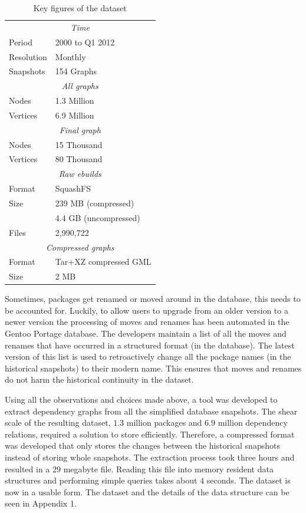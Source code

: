 \documentclass[smallextended,final]{svjour3}
\begin{document}
\begin{table}
\vspace{-1em}
\small\centering
\caption{Key figures of the dataset}\label{tbl:dataset}
\begin{tabular}{ll}
\toprule
\multicolumn{2}{c}{\emph{Time}} \\[0.5mm]
Period & 2000 to Q1 2012 \\
Resolution & Monthly \\
Snapshots & 154 Graphs \\
\midrule
\multicolumn{2}{c}{\emph{All graphs}} \\[0.5mm]
Nodes & 1.3 Million \\
Vertices & 6.9 Million \\
\midrule
\multicolumn{2}{c}{\emph{Final graph}} \\[0.5mm]
Nodes & 15 Thousand \\
Vertices & 80 Thousand \\
\midrule
\multicolumn{2}{c}{\emph{Raw ebuilds}} \\[0.5mm]
Format & SquashFS \\
Size & 239 MB (compressed) \\
 & 4.4 GB (uncompressed) \\
Files & 2,990,722 \\
\midrule
\multicolumn{2}{c}{\emph{Compressed graphs}} \\[0.5mm]
Format & Tar+XZ compressed GML \\
Size & 2 MB \\
\bottomrule
\end{tabular}
\vspace{-1em}
\end{table}

Sometimes, packages get renamed or moved around in the database, this needs to be accounted for. Luckily, to allow users to upgrade from an older version to a newer version the processing of moves and renames has been automated in the Gentoo Portage database. The developers maintain a list of all the moves and renames that have occurred in a structured format (in the database). The latest version of this list is used to retroactively change all the package names (in the historical snapshots) to their modern name. This ensures that moves and renames do not harm the historical continuity in the dataset.

Using all the observations and choices made above, a tool was developed to extract dependency graphs from all the simplified database snapshots. The shear scale of the resulting dataset, $1.3$ million packages and $6.9$ million dependency relations, required a solution to store efficiently. Therefore, a compressed format was developed that only stores the changes between the historical snapshots instead of storing whole snapshots. The extraction process took three hours and resulted in a $29$ megabyte file. Reading this file into memory resident data structures and performing simple queries takes about $4$ seconds. The dataset is now in a usable form. The dataset and the details of the data structure can be seen in Appendix 1.
\end{document}
